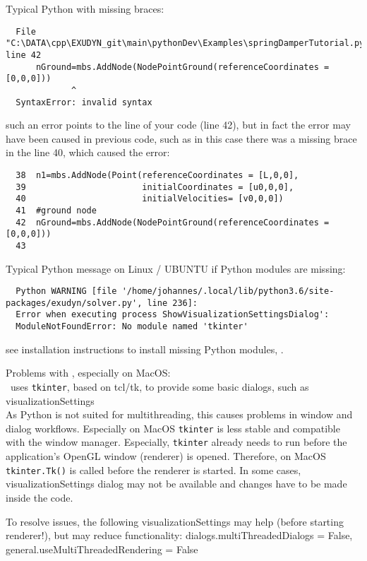   \item Typical Python  with missing braces:
\plainlststyle
\begin{lstlisting}
  File "C:\DATA\cpp\EXUDYN_git\main\pythonDev\Examples\springDamperTutorial.py", line 42
      nGround=mbs.AddNode(NodePointGround(referenceCoordinates = [0,0,0]))
             ^
  SyntaxError: invalid syntax
\end{lstlisting}
%
\item[$\ra$] such an error points to the line of your code (line 42), but in fact the error may have been caused in previous code, such as in this case there was a missing brace in the line 40, which caused the error:
\pythonstyle\begin{lstlisting}
  38  n1=mbs.AddNode(Point(referenceCoordinates = [L,0,0], 
  39                       initialCoordinates = [u0,0,0], 
  40                       initialVelocities= [v0,0,0])	
  41  #ground node
  42  nGround=mbs.AddNode(NodePointGround(referenceCoordinates = [0,0,0]))
  43  
\end{lstlisting}
%
%
\item Typical Python  message on Linux / UBUNTU if Python modules are missing:
\plainlststyle
\begin{lstlisting}
  Python WARNING [file '/home/johannes/.local/lib/python3.6/site-packages/exudyn/solver.py', line 236]: 
  Error when executing process ShowVisualizationSettingsDialog':
  ModuleNotFoundError: No module named 'tkinter'
\end{lstlisting}
%
\item[$\ra$] see installation instructions to install missing Python modules, .

\item Problems with , especially on MacOS:\\
  \codeName\ uses \texttt{tkinter}, based on tcl/tk, to provide some basic dialogs, such as visualizationSettings\\
  As Python is not suited for multithreading, this causes problems in window and dialog workflows. Especially on MacOS
  \texttt{tkinter} is less stable and compatible with the window manager. Especially, \texttt{tkinter} already needs to run
  before the application's OpenGL window (renderer) is opened. Therefore, on MacOS \texttt{tkinter.Tk()} is called before the 
  renderer is started.
  In some cases, visualizationSettings dialog may not be available and changes have to be made inside the code.
\item[$\ra$] To resolve issues, the following visualizationSettings may help (before starting renderer!), but may reduce functionality: 
    dialogs.multiThreadedDialogs = False, general.useMultiThreadedRendering = False
\ei 



